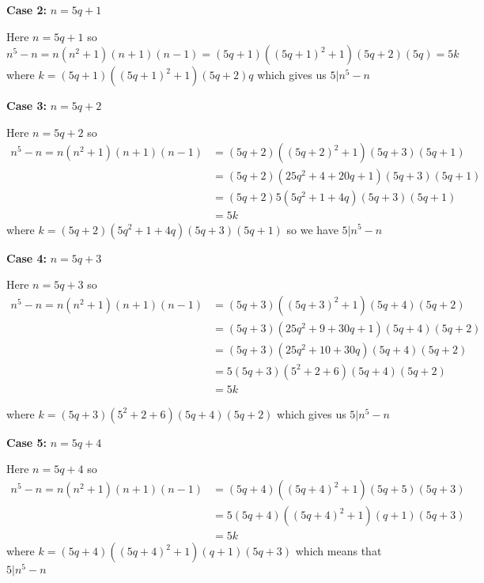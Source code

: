 \documentclass[a4paper]{report}
\begin{document}
\textbf{Case 2:}  $n = 5q + 1$

 Here $n = 5q + 1$ so  $$n^{5} - n = n(n^2 + 1)(n + 1)(n - 1) = (5q + 1)((5q + 1)^2 + 1)(5q + 2)(5q) = 5k$$ where $k =  (5q + 1)((5q + 1)^2 + 1)(5q + 2)q$ which gives us $5 | n^{5} - n$

\textbf{Case 3:}  $n = 5q + 2$

 Here $n = 5q + 2$ so  
 \begin{align*}
     n^{5} - n = n(n^2 + 1)(n + 1)(n - 1) &= (5q + 2)((5q + 2)^2 + 1)(5q  + 3)(5q + 1)\\
                                          &= (5q + 2)(25q^2 + 4 + 20q + 1)(5q + 3)(5q + 1)\\
                                          &= (5q + 2)5(5q^2 + 1 + 4q)(5q + 3)(5q + 1)\\
                                          &= 5k
 \end{align*}
 where $k = (5q + 2)(5q^2 + 1 + 4q)(5q + 3)(5q + 1)$ so we have  $5 | n^{5} - n$

 \textbf{Case 4:}  $n = 5q + 3$

 Here $n = 5q + 3$ so  
 \begin{align*}
     n^{5} - n = n(n^2 + 1)(n + 1)(n - 1) &= (5q + 3)((5q + 3)^2 + 1)(5q + 4)(5q + 2) \\
                                          &=  (5q + 3)(25q^2 + 9 + 30q + 1)(5q + 4)(5q + 2) \\
                                          &=  (5q + 3)(25q^2 + 10 + 30q)(5q + 4)(5q + 2) \\
                                          &=  5(5q + 3)(5^2 + 2 + 6)(5q + 4)(5q + 2) \\
                                          &=  5k
 \end{align*}

 where $k= (5q + 3)(5^2 + 2 + 6)(5q + 4)(5q + 2) $ which gives us  $5 | n^{5} - n$


 \textbf{Case 5:}  $n = 5q + 4$

 Here $n = 5q + 4$ so  
 \begin{align*}
     n^{5} - n = n(n^2 + 1)(n + 1)(n - 1) &= (5q + 4)((5q + 4)^2 + 1)(5q + 5)(5q + 3)\\
                                          &=  5(5q + 4)((5q + 4)^2 + 1)(q + 1)(5q + 3)\\
                                          &= 5k
 \end{align*}
 where $k = (5q + 4)((5q + 4)^2 + 1)(q + 1)(5q + 3)$ which means that $5 | n^{5} - n$
\end{document}
